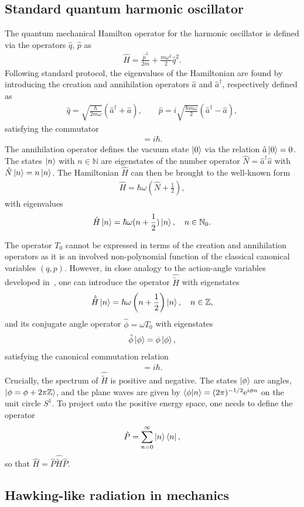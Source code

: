 \documentclass[onecolumn,notitlepage,superscriptaddress, nofootinbib,nobibnotes, aps,prd,10pt]{revtex4-1}%
\def\be{\begin{eqnarray}}
\def\ee{\end{eqnarray}}
\begin{document}
\subsection{Standard quantum harmonic oscillator}

The quantum mechanical Hamilton operator for the harmonic oscillator is defined via the operators $\hat{q}$, $\hat{p}$ as 
\be
\hat{H} = \frac{\hat{p}^2}{2m} + \frac{m\omega^2}{2}\hat{q}^2.
\ee
Following standard protocol, the eigenvalues of the Hamiltonian are found by introducing the creation and annihilation operators $\hat{a}$ and $\hat{a}^\dagger$, respectively defined as
\be
\hat{q} = \sqrt{\frac{\hbar}{2m\omega}}\left(\hat{a}^\dagger + \hat{a}\right),\qquad \hat{p} = i\sqrt{\frac{\hbar m\omega}{2}}\left(\hat{a}^\dagger - \hat{a}\right),
\ee
satisfying the commutator
\be
[a, a^{\dagger}] = i \hbar.
\ee
The annihilation operator defines the vacuum state $\ket{0}$ via the relation $\hat{a}\ket{0} = 0$. The states $\ket{n}$ with $n\in\mathbb{N}$ are eigenstates of the number operator $\hat{N} = \hat{a}^\dagger\hat{a}$ with $\hat{N}\ket{n} = n\ket{n}$. The Hamiltonian $\hat{H}$ can then be brought to the well-known form
\be
\hat{H} = \hbar \omega \left( \hat{N} + \frac{1}{2}\right),
\ee
with eigenvalues
\be
\hat{H}\ket{n} = \hbar\omega(n+\frac{1}{2})\ket{n},\quad n\in\mathbb{N}_0.
\ee

The operator $T_0$ cannot be expressed in terms of the creation and annihilation operators as it is an involved non-polynomial function of the classical canonical variables $(q,p)$. However, in close analogy to the action-angle variables developed in~\cite{Augustin1979}, one can introduce the operator $\hat{\tilde{H}}$  with eigenstates 
\be
\hat{\tilde{H}}\ket{n} = \hbar\omega\left(n+\frac{1}{2}\right)\ket{n}, \quad n\in\mathbb{Z},
\ee
and its conjugate angle operator $\hat{\phi} = \omega \hat{T}_0$ with eigenstates
\be
\hat{\phi} \ket{\phi} = \phi \ket{\phi},
\ee
satisfying the canonical commutation relation
\be
[\hat{\phi},\hat{\tilde{H}}/\omega] = i \hbar.
\ee
Crucially, the spectrum of $\hat{\tilde{H}}$ is positive and negative. The states $\ket{\phi}$ are angles, $\ket{\phi = \phi+2\pi\mathbb{Z}}$, and the plane waves are given by $\braket{\phi}{n} = (2\pi)^{-1/2}\mathrm{e}^{i\phi n}$ on the unit circle $S^1$. To project onto the positive energy space, one needs to define the operator
\be
\hat{P} = \sum_{n = 0}^{\infty}\ket{n}\bra{n},
\ee
so that $\hat{H} = \hat{P}\hat{\tilde{H}}\hat{P}$.




\subsection{Hawking-like radiation in mechanics}
\end{document}
